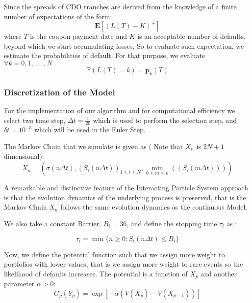Since the spreads of CDO tranches are derived from the knowledge of a finite
number of expectations of the form:
\begin{equation}
	\mathbf{E}[(L(T)-K)^{+}]
\end{equation}
where $T$ is the coupon payment date and $K$ is an acceptable number of defaults, 
beyond which we start accumulating losses. So to evaluate such expectation, we 
estimate the probabilities of default. For that purpose, we evaluate 
$\forall k = 0,1,.....,N$
\begin{equation}
	\mathbb{P}(L(T)=k) = \mathbf{p}_{k}(T)
\end{equation}

\subsubsection{Discretization of the Model}
For the implementation of our algorithm and for computational efficiency we 
select two time step, $\Delta t = \frac{1}{20}$ which is used to perform the 
selection step, and $\delta t = 10^{-3}$ which will be used in the Euler Step.

The Markov Chain that we simulate is given as ( Note that $X_n$ is $2N + 1$ dimensional):
\begin{equation}
	\label{eq:merton_markov_chain}
	X_{n} = \left( \sigma \left( n \Delta t \right), \left( S_i \left( n \Delta
	t\right) \right)_{1 \leq i \leq N} , \min_{0 \leq m \leq n} \left( \left( S_i
	\left( m \Delta t \right) \right) \right) \right)
\end{equation}

A remarkable and distinctive feature of the Interacting Particle System approach 
is that the evolution dynamics of the underlying process is preserved, that is 
the Markov Chain $X_n$ follows the same evolution dynamics as the continuous Model.

We also take a constant Barrier, $B_i =36$, and define the stopping time $\tau_i$ as :

\begin{equation}
	\tau_i = \min \{ n \geq 0 : S_i(n \Delta t) \leq B_i \}
\end{equation}

Now, we define the potential function such that we assign more weight to portfolios 
with lower values, that is we assign more weight to rare events so the likelihood 
of defaults increases. The potential is a function of $X_p$ and another 
parameter $\alpha > 0$:
\begin{equation}
	\label{eq:merton_potential}
	G_{p}(Y_{p}) = \exp[-\alpha (V(X_p) - V(X_{p-1}))]
\end{equation}

